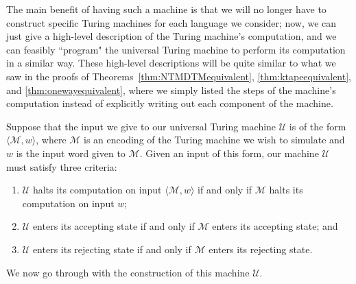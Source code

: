 The main benefit of having such a machine is that we will no longer have to construct specific Turing machines for each language we consider; now, we can just give a high-level description of the Turing machine's computation, and we can feasibly ``program" the universal Turing machine to perform its computation in a similar way. These high-level descriptions will be quite similar to what we saw in the proofs of Theorems~\ref{thm:NTMDTMequivalent}, \ref{thm:ktapeequivalent}, and \ref{thm:onewayequivalent}, where we simply listed the steps of the machine's computation instead of explicitly writing out each component of the machine.

Suppose that the input we give to our universal Turing machine $\mathcal{U}$ is of the form $\langle \mathcal{M}, w \rangle$, where $\mathcal{M}$ is an encoding of the Turing machine we wish to simulate and $w$ is the input word given to $\mathcal{M}$. Given an input of this form, our machine $\mathcal{U}$ must satisfy three criteria:
\begin{colouredbox}
\begin{enumerate}
\item $\mathcal{U}$ halts its computation on input $\langle \mathcal{M}, w \rangle$ if and only if $\mathcal{M}$ halts its computation on input $w$;
\item $\mathcal{U}$ enters its accepting state if and only if $\mathcal{M}$ enters its accepting state; and
\item $\mathcal{U}$ enters its rejecting state if and only if $\mathcal{M}$ enters its rejecting state.
\end{enumerate}
\end{colouredbox}

We now go through with the construction of this machine $\mathcal{U}$.

